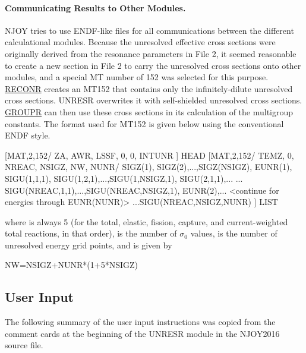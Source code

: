 \paragraph{Communicating Results to Other Modules.}  NJOY tries
to use ENDF-like files for all communications between the different
calculational modules.  Because the unresolved effective cross
sections were originally derived from the resonance parameters in
File 2, it seemed reasonable to create a new section in File 2
to carry the unresolved cross sections onto other modules, and
a special MT number of 152 was selected for this purpose.
\hyperlink{sRECONRhy}{RECONR} creates
an MT152 that contains only the
infinitely-dilute unresolved cross sections.  UNRESR overwrites it
with self-shielded unresolved cross
sections.  \hyperlink{sGROUPRhy}{GROUPR}
can then use these cross sections in its calculation of the multigroup
constants.  The format used for MT152 is given below using the
conventional ENDF style.

\small
\begin{ccode}

[MAT,2,152/ ZA, AWR, LSSF, 0, 0, INTUNR ] HEAD
[MAT,2,152/ TEMZ, 0, NREAC, NSIGZ, NW, NUNR/
            SIGZ(1), SIGZ(2),...,SIGZ(NSIGZ),
            EUNR(1),
            SIGU(1,1,1), SIGU(1,2,1),...,SIGU(1,NSIGZ,1),
            SIGU(2,1,1),...
            ...
            SIGU(NREAC,1,1),...,SIGU(NREAC,NSIGZ,1),
            EUNR(2),...
              <continue for energies through EUNR(NUNR)>
            ...SIGU(NREAC,NSIGZ,NUNR) ] LIST

\end{ccode}
\normalsize

\noindent
where  is always 5 (for the total, elastic,
fission, capture, and current-weighted total reactions, in that order),
 is the number of $\sigma_0$ values,  is
the number of unresolved energy grid points, and  is
given by

\small
\begin{ccode}

   NW=NSIGZ+NUNR*(1+5*NSIGZ)

\end{ccode}
\normalsize

\subsection{User Input}
\label{ssUNRESR_inp}

The following summary of the user input instructions was copied
from the comment cards at the beginning of the UNRESR module
in the NJOY2016 source file.

